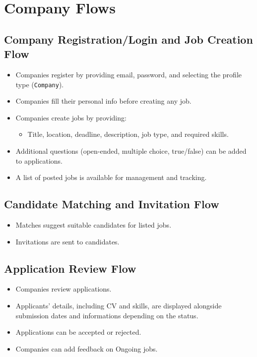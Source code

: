 \section{Company Flows}

\subsection{Company Registration/Login and Job Creation Flow}
\begin{itemize}
    \item Companies register by providing email, password, and selecting the profile type (\texttt{Company}).
    \item Companies fill their personal info before creating any job.
    \item Companies create jobs by providing:
    \begin{itemize}
        \item Title, location, deadline, description, job type, and required skills.
    \end{itemize}
    \item Additional questions (open-ended, multiple choice, true/false) can be added to applications.
    \item A list of posted jobs is available for management and tracking.
\end{itemize}

\subsection{Candidate Matching and Invitation Flow}
\begin{itemize}
    \item Matches suggest suitable candidates for listed jobs.
    \item Invitations are sent to candidates.
\end{itemize}

\subsection{Application Review Flow}
\begin{itemize}
    \item Companies review applications.
    \item Applicants’ details, including CV and skills, are displayed alongside submission dates and informations depending on the status.
    \item Applications can be accepted or rejected.
    \item Companies can add feedback on Ongoing jobs.
\end{itemize}

